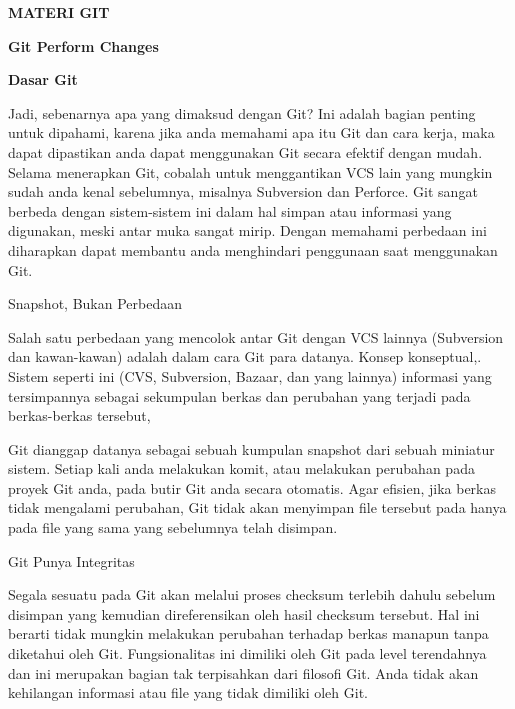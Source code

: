 
\sloppy
\begin{center}{\fontsize{16pt}{16pt}\selectfont \textbf{MATERI GIT} \\}\end{center} \par
\noindent 
\begin{center}{\fontsize{14pt}{14pt}\selectfont \textbf{Git Perform Changes} \\}\end{center} \par
\vspace{12pt}
\noindent 
{\fontsize{14pt}{14pt}\selectfont \textbf{Dasar Git} \\} \par
\noindent 
Jadi, sebenarnya apa yang dimaksud dengan Git? Ini adalah bagian penting untuk dipahami, karena jika anda memahami apa itu Git dan cara kerja, maka dapat dipastikan anda dapat menggunakan Git secara efektif dengan mudah. Selama menerapkan Git, cobalah untuk menggantikan VCS lain yang mungkin sudah anda kenal sebelumnya, misalnya Subversion dan Perforce. Git sangat berbeda dengan sistem-sistem ini dalam hal simpan atau informasi yang digunakan, meski antar muka sangat mirip. Dengan memahami perbedaan ini diharapkan dapat membantu anda menghindari penggunaan saat menggunakan Git. \par
\noindent 
Snapshot, Bukan Perbedaan \par
\noindent 
Salah satu perbedaan yang mencolok antar Git dengan VCS lainnya (Subversion dan kawan-kawan) adalah dalam cara Git para datanya. Konsep konseptual,. Sistem seperti ini (CVS, Subversion, Bazaar, dan yang lainnya) informasi yang tersimpannya sebagai sekumpulan berkas dan perubahan yang terjadi pada berkas-berkas tersebut, \par
\noindent 
Git dianggap datanya sebagai sebuah kumpulan snapshot dari sebuah miniatur sistem. Setiap kali anda melakukan komit, atau melakukan perubahan pada proyek Git anda, pada butir Git anda secara otomatis. Agar efisien, jika berkas tidak mengalami perubahan, Git tidak akan menyimpan file tersebut pada hanya pada file yang sama yang sebelumnya telah disimpan. \par
\vspace{12pt}
\noindent 
Git Punya Integritas \par
\noindent 
Segala sesuatu pada Git akan melalui proses checksum terlebih dahulu sebelum disimpan yang kemudian direferensikan oleh hasil checksum tersebut. Hal ini berarti tidak mungkin melakukan perubahan terhadap berkas manapun tanpa diketahui oleh Git. Fungsionalitas ini dimiliki oleh Git pada level terendahnya dan ini merupakan bagian tak terpisahkan dari filosofi Git. Anda tidak akan kehilangan informasi atau file yang tidak dimiliki oleh Git. \par
